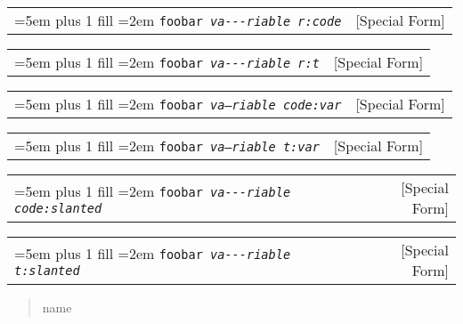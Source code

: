 \documentclass{book}
\newcommand\GNUTexinfocommandstyletextvar[1]{{\normalfont{}\textsl{#1}}}%
\begin{document}
\noindent\begin{tabularx}{\linewidth}{@{}Xr}
\rightskip=5em plus 1 fill
\hangindent=2em
\texttt{foobar \EmbracOn{}\textnormal{\textsl{\EmbracOff{}\textnormal{\texttt{va{-}{-}{-}riable}}\EmbracOn{} r:code}}\EmbracOff{}}& [Special Form]
\end{tabularx}

%

\noindent\begin{tabularx}{\linewidth}{@{}Xr}
\rightskip=5em plus 1 fill
\hangindent=2em
\texttt{foobar \EmbracOn{}\textnormal{\textsl{\EmbracOff{}\textnormal{\texttt{va{-}{-}{-}riable}}\EmbracOn{} r:t}}\EmbracOff{}}& [Special Form]
\end{tabularx}

%

\noindent\begin{tabularx}{\linewidth}{@{}Xr}
\rightskip=5em plus 1 fill
\hangindent=2em
\texttt{foobar \EmbracOn{}\textnormal{\textsl{\texttt{\GNUTexinfocommandstyletextvar{va---riable}} code:var}}\EmbracOff{}}& [Special Form]
\end{tabularx}

%

\noindent\begin{tabularx}{\linewidth}{@{}Xr}
\rightskip=5em plus 1 fill
\hangindent=2em
\texttt{foobar \EmbracOn{}\textnormal{\textsl{\texttt{\GNUTexinfocommandstyletextvar{va---riable}} t:var}}\EmbracOff{}}& [Special Form]
\end{tabularx}

%

\noindent\begin{tabularx}{\linewidth}{@{}Xr}
\rightskip=5em plus 1 fill
\hangindent=2em
\texttt{foobar \EmbracOn{}\textnormal{\textsl{\texttt{\textsl{va{-}{-}{-}riable}} code:slanted}}\EmbracOff{}}& [Special Form]
\end{tabularx}

%

\noindent\begin{tabularx}{\linewidth}{@{}Xr}
\rightskip=5em plus 1 fill
\hangindent=2em
\texttt{foobar \EmbracOn{}\textnormal{\textsl{\texttt{\textsl{va{-}{-}{-}riable}} t:slanted}}\EmbracOff{}}& [Special Form]
\end{tabularx}

%
\begin{quote}
\unskip{\parskip=0pt\noindent}%
name
\end{quote}
\end{document}
